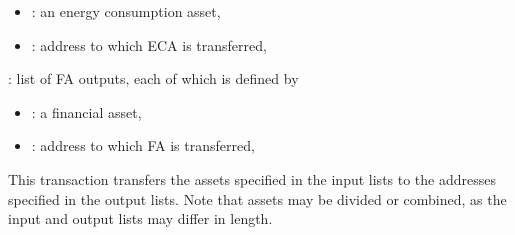 \begin{compactitem}
\begin{itemize}[leftmargin=0.5em,nosep]
\item {}: an energy consumption asset,
\item {}: address to which ECA is transferred,
\end{itemize}
\item {}: list of FA outputs, each of which is defined by
\begin{itemize}[leftmargin=0.5em,nosep]
\item {}: a financial asset,
\item {}: address to which FA is transferred,
\end{itemize}
\end{compactitem}
This transaction transfers the assets specified in the input lists to the addresses specified in the output lists. 
Note that assets may be divided or combined, as the input and output lists may differ in length.

